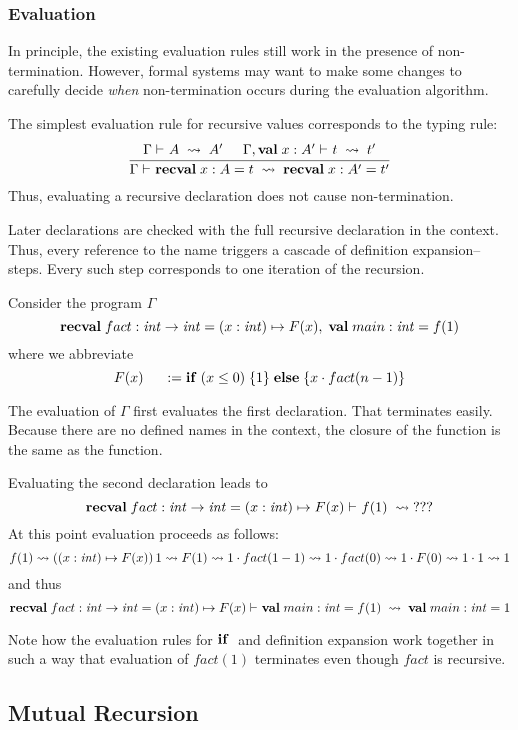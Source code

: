 \subsubsection{Evaluation}

In principle, the existing evaluation rules still work in the presence of non-termination.
However, formal systems may want to make some changes to carefully decide \emph{when} non-termination occurs during the evaluation algorithm.

The simplest evaluation rule for recursive values corresponds to the typing rule:
\[\rul{\evobj{}{\Gamma}{A}{A'} \tb \evobj{}{\Gamma,\aval{x}{A'}{}}{t}{t'}}
      {\evdec{}{\Gamma}{\arecval{x}{A}{t}}\arecval{x}{A'}{t'}}
\]
Thus, evaluating a recursive declaration does not cause non-termination.

Later declarations are checked with the full recursive declaration in the context.
Thus, every reference to the name triggers a cascade of definition expansion--steps.
Every such step corresponds to one iteration of the recursion.

\begin{example}
Consider the program $\Gamma$
\[\arecval{fact}{\Int\to\Int}{\alam[\Int]{x}{F(x)}}, \; \aval{main}{\Int}{f(1)}\]
where we abbreviate
\[F(x) \tb := \aifelseI{x\leq 0}{1}{x\cdot fact(n-1)}\]

The evaluation of $\Gamma$ first evaluates the first declaration.
That terminates easily. Because there are no defined names in the context, the closure of the function is the same as the function.

Evaluating the second declaration leads to
\[\evobj{}{\arecval{fact}{\Int\to\Int}{\alam[\Int]{x}{F(x)}}}{f(1)}{???}\]
At this point evaluation proceeds as follows:
\[f(1) \rewrites (\alam[\Int]{x}{F(x)})\,1 \rewrites F(1) \rewrites 1\cdot fact(1-1) \rewrites 1 \cdot fact(0) \rewrites 1\cdot F(0) \rewrites 1\cdot 1\rewrites 1\]
and thus
\[\evobj{}{\arecval{fact}{\Int\to\Int}{\alam[\Int]{x}{F(x)}}}{\aval{main}{\Int}{f(1)}}{\aval{main}{\Int}{1}}\]

Note how the evaluation rules for ${\rm \bf if}\;$ and definition expansion work together in such a way that evaluation of $fact(1)$ terminates even though $fact$ is recursive.
\end{example}

\subsection{Mutual Recursion}

